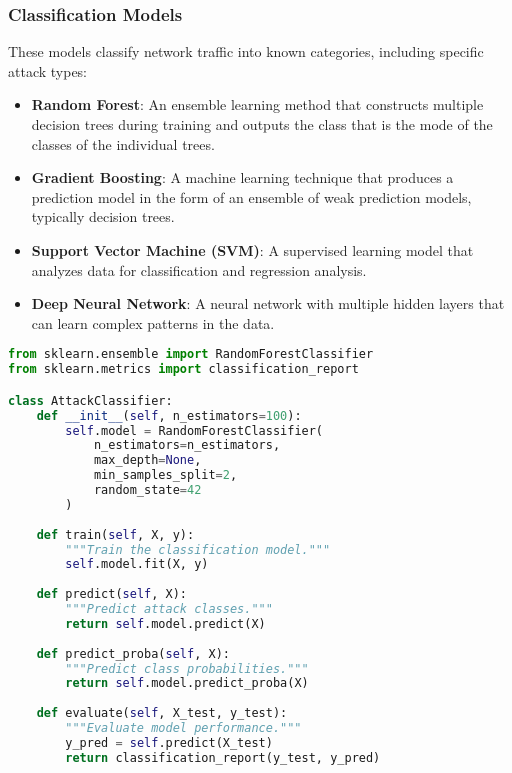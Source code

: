 \subsubsection{Classification Models}
These models classify network traffic into known categories, including specific attack types:

\begin{itemize}
    \item \textbf{Random Forest}: An ensemble learning method that constructs multiple decision trees during training and outputs the class that is the mode of the classes of the individual trees.
    
    \item \textbf{Gradient Boosting}: A machine learning technique that produces a prediction model in the form of an ensemble of weak prediction models, typically decision trees.
    
    \item \textbf{Support Vector Machine (SVM)}: A supervised learning model that analyzes data for classification and regression analysis.
    
    \item \textbf{Deep Neural Network}: A neural network with multiple hidden layers that can learn complex patterns in the data.
\end{itemize}

\begin{lstlisting}[language=Python, caption=Random Forest Classifier Implementation]
from sklearn.ensemble import RandomForestClassifier
from sklearn.metrics import classification_report

class AttackClassifier:
    def __init__(self, n_estimators=100):
        self.model = RandomForestClassifier(
            n_estimators=n_estimators,
            max_depth=None,
            min_samples_split=2,
            random_state=42
        )
        
    def train(self, X, y):
        """Train the classification model."""
        self.model.fit(X, y)
        
    def predict(self, X):
        """Predict attack classes."""
        return self.model.predict(X)
        
    def predict_proba(self, X):
        """Predict class probabilities."""
        return self.model.predict_proba(X)
        
    def evaluate(self, X_test, y_test):
        """Evaluate model performance."""
        y_pred = self.predict(X_test)
        return classification_report(y_test, y_pred)
\end{lstlisting}

